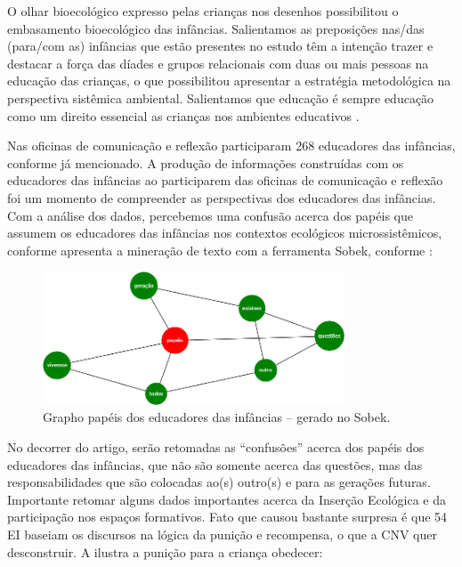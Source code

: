\documentclass{textolivre}
\begin{document}
O olhar bioecológico expresso pelas crianças nos desenhos possibilitou o embasamento bioecológico das infâncias. Salientamos as preposições nas/das (para/com as) infâncias que estão presentes no estudo têm a intenção trazer e destacar a força das díades e grupos relacionais com duas ou mais pessoas na educação das crianças, o que possibilitou apresentar a estratégia metodológica na perspectiva sistêmica ambiental. Salientamos que educação é sempre educação como um direito essencial as crianças nos ambientes educativos \cite{piske2019}. 

Nas oficinas de comunicação e reflexão participaram 268 educadores das infâncias, conforme já mencionado. A produção de informações construídas com os educadores das infâncias ao participarem das oficinas de comunicação e reflexão foi um momento de compreender as perspectivas dos educadores das infâncias. Com a análise dos dados, percebemos uma confusão acerca dos papéis que assumem os educadores das infâncias nos contextos ecológicos microssistêmicos, conforme apresenta a mineração de texto com a ferramenta Sobek, conforme :

\begin{figure}[h!]
 \centering
 \includegraphics[width=0.8\textwidth]{figure07.png}
 \caption{Grapho papéis dos educadores das infâncias -- gerado no Sobek.}
 \label{fig-fig07}
\end{figure}


No decorrer do artigo, serão retomadas as “confusões” acerca dos papéis dos educadores das infâncias, que não são somente acerca das questões, mas das responsabilidades que são colocadas ao(s) outro(s) e para as gerações futuras. Importante retomar alguns dados importantes acerca da Inserção Ecológica e da participação nos espaços formativos. Fato que causou bastante surpresa é que 54 EI baseiam os discursos na lógica da punição e recompensa, o que a CNV quer desconstruir. A  ilustra a punição para a criança obedecer: 
\end{document}
